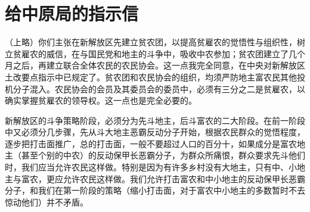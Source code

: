 \section[给中原局的指示信（一九四八年二月十七日）]{给中原局的指示信}


（上略）你们主张在新解放区先建立贫农团，以提高贫雇农的觉悟性与组织性，树立贫雇农的威信，在与国民党和地主的斗争中，吸收中农参加；贫农团建立了几个月之后，再建立联合全体农民的农民协会。这一点我完全同意，在中央对新解放区土改要点指示中已规定了。贫农团和农民协会的组织，均须严防地主富农民其他投机分子混入。农民协会的会员及其委员会的委员中，必须有三分之二是贫雇农，以确实掌握贫雇农的领导权。这一点也是完全必要的。

新解放区的斗争策略阶段，必须分为先斗地主，后斗富农的二大阶段。在前一阶段中又必须分几步骤，先从斗大地主恶霸反动分子开始，根据农民群众的觉悟程度，逐步把打击面推广，总的打击面，一般不要超过人口的百分十，如果成分是富农地主（甚至个别的中农）的反动保甲长恶霸分子，为群众所痛恨，群众要求先斗他们时，我们应当允许农民这样做。特别是因为有许多乡村没有大地主，只有中、小地主与富农，更应允许农民这样做。我们允许打击富农和中小地主的反动保甲长恶霸分子，和我们在第一阶段的策略（缩小打击面，对于富农中小地主的多数暂时不去惊动他们）并不矛盾。

